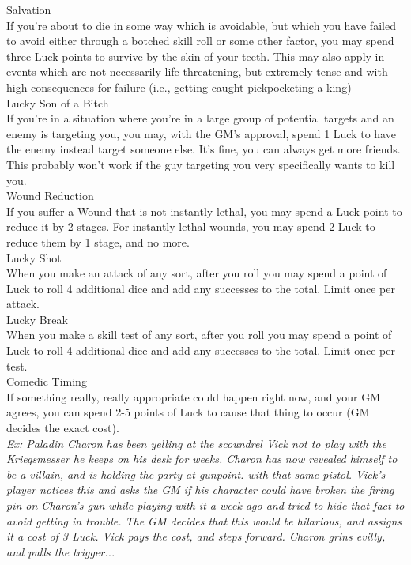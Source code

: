 \documentclass[a4paper, twocolumn, openany]{book}
\begin{document}
{{\large Salvation\\}
If you’re about to die in some way which is avoidable, but which you have failed to avoid either
through a botched skill roll or some other factor, you may spend three Luck points to survive by
the skin of your teeth. This may also apply in events which are not necessarily life-threatening,
but extremely tense and with high consequences for failure (i.e., getting caught pickpocketing a
king)\\

{\large Lucky Son of a Bitch\\}
If you’re in a situation where you’re in a large group of potential targets and an enemy is
targeting you, you may, with the GM’s approval, spend 1 Luck to have the enemy instead target
someone else. It’s fine, you can always get more friends. This probably won’t work if the guy
targeting you very specifically wants to kill you.\\

{\large Wound Reduction\\}
If you suffer a Wound that is not instantly lethal, you may spend a Luck point to reduce it by 2
stages. For instantly lethal wounds, you may spend 2 Luck to reduce them by 1 stage, and no
more.\\

{\large Lucky Shot\\}
When you make an attack of any sort, after you roll you may spend a point of Luck to roll 4
additional dice and add any successes to the total. Limit once per attack.\\

{\large Lucky Break\\}
When you make a skill test of any sort, after you roll you may spend a point of Luck to roll 4
additional dice and add any successes to the total. Limit once per test.\\

{\large Comedic Timing\\}
If something really, really appropriate could happen right now, and your GM agrees, you can
spend 2-5 points of Luck to cause that thing to occur (GM decides the exact cost).\\

{\itshape Ex: Paladin Charon has been yelling at the scoundrel Vick not to play with the Kriegsmesser he
keeps on his desk for weeks. Charon has now revealed himself to be a villain, and is holding the
party at gunpoint. with that same pistol. Vick’s player notices this and asks the GM if his
character could have broken the firing pin on Charon’s gun while playing with it a week ago and
tried to hide that fact to avoid getting in trouble. The GM decides that this would be hilarious,
and assigns it a cost of 3 Luck. Vick pays the cost, and steps forward. Charon grins evilly, and
pulls the trigger...}\\

}
\end{document}
